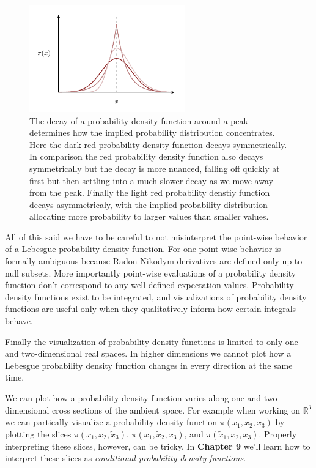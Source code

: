 \documentclass[
  letterpaper,
  DIV=11,
  numbers=noendperiod]{scrartcl}
\begin{document}
\begin{figure}

{\centering \includegraphics[width=0.6\textwidth,height=\textheight]{figures/varying_shapes/varying_shapes.pdf}

}

\caption{\label{fig-varying-shapes}The decay of a probability density
function around a peak determines how the implied probability
distribution concentrates. Here the dark red probability density
function decays symmetrically. In comparison the red probability density
function also decays symmetrically but the decay is more nuanced,
falling off quickly at first but then settling into a much slower decay
as we move away from the peak. Finally the light red probability denstiy
function decays asymmetricaly, with the implied probability distribution
allocating more probability to larger values than smaller values.}

\end{figure}

All of this said we have to be careful to not misinterpret the
point-wise behavior of a Lebesgue probability density function. For one
point-wise behavior is formally ambiguous because Radon-Nikodym
derivatives are defined only up to null subsets. More importantly
point-wise evaluations of a probability density function don't
correspond to any well-defined expectation values. Probability density
functions exist to be integrated, and visualizations of probability
density functions are useful only when they qualitatively inform how
certain integrals behave.

Finally the visualization of probability density functions is limited to
only one and two-dimensional real spaces. In higher dimensions we cannot
plot how a Lebesgue probability density function changes in every
direction at the same time.

We can plot how a probability density function varies along one and
two-dimensional cross sections of the ambient space. For example when
working on \(\mathbb{R}^{3}\) we can partically visualize a probability
density function \(\pi(x_{1}, x_{2}, x_{3})\) by plotting the slices
\(\pi(x_{1}, x_{2}, \tilde{x}_{3})\),
\(\pi(x_{1}, \tilde{x}_{2}, x_{3})\), and
\(\pi(\tilde{x}_{1}, x_{2}, x_{3})\). Properly interpreting these
slices, however, can be tricky. In \textbf{Chapter 9} we'll learn how to
interpret these slices as \emph{conditional probability density
functions}.
\end{document}
